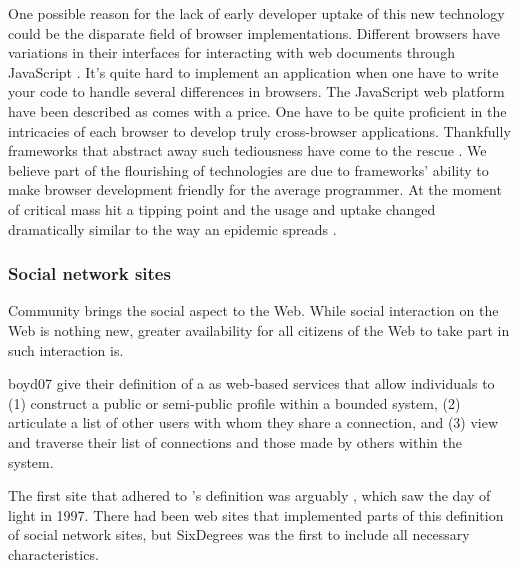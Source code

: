 One possible reason for the lack of early developer uptake of this new
technology could be the disparate field of browser implementations.
Different browsers have variations in their interfaces for interacting with
web documents through JavaScript%
. It's quite hard to implement an application
when one have to write your code to handle several differences in browsers.
The JavaScript web platform have been described as
 comes with a price. One have to be quite proficient in the
intricacies of each browser to develop truly cross-browser applications.
Thankfully frameworks that abstract away such tediousness have come to
the rescue \citet[]{mesbah07}. We believe part of the flourishing of
 technologies are due to frameworks' ability to make browser
development friendly for the average programmer. At the moment of critical
mass  hit a tipping point and the usage and uptake changed
dramatically similar to the way an epidemic spreads
\citep[]{gladwell02}.

\subsubsection{Social network sites}
\label{section:social.navigation.sociality.the.social.web.social.network.sites}
Community brings the social aspect to the Web. While social
interaction on the Web is nothing new, greater availability for all
citizens of the Web to take part in such interaction is.

\begin{fullquote}{boyd07}{%
  give their definition of a  as}
    web-based services that allow individuals to (1) construct a public
    or semi-public profile within a bounded system, (2) articulate a list of
    other users with whom they share a connection, and (3) view and traverse
    their list of connections and those made by others within the system.
\end{fullquote}

The first site that adhered to \citeauthor{boyd07}'s definition was arguably
, which saw the day of light in 1997.%
There had been web sites that implemented
parts of this definition of social network sites, but SixDegrees was the
first to include all necessary characteristics.

